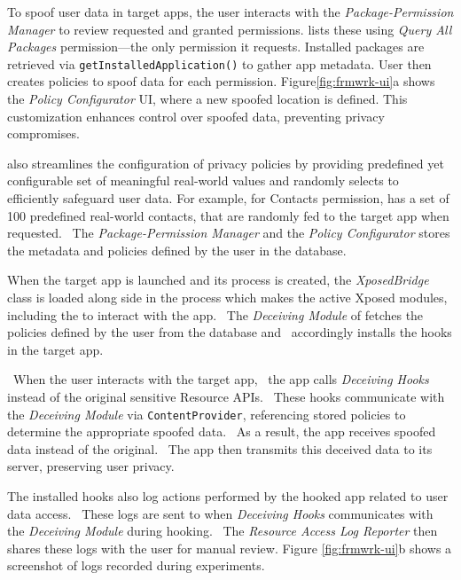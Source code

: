 To spoof user data in target apps, the user interacts with the \textit{Package-Permission Manager} to review requested and granted permissions. \framework{} lists these using \textit{Query All Packages} permission—the only permission it requests. Installed packages are retrieved via \texttt{getInstalledApplication()} to gather app metadata. User then creates policies to spoof data for each permission. Figure\ref{fig:frmwrk-ui}a shows the \textit{Policy Configurator} UI, where a new spoofed location is defined. This customization enhances control over spoofed data, preventing privacy compromises.

\framework{} also streamlines the configuration of privacy policies by providing predefined yet configurable set of meaningful real-world values and randomly selects to efficiently safeguard user data. For example, for Contacts permission, \framework{} has a set of 100 predefined real-world contacts, that are randomly fed to the target app when requested. ~The \textit{Package-Permission Manager} and the \textit{Policy Configurator} stores the metadata and policies defined by the user in the database. 

When the target app is launched and its process is created, the \textit{XposedBridge} class is loaded along side in the process which makes the active Xposed modules, including the \framework{} to interact with the app. ~The \textit{Deceiving Module} of \framework{} fetches the policies defined by the user from the database and ~accordingly installs the hooks in the target app.

~When the user interacts with the target app, ~the app calls \textit{Deceiving Hooks} instead of the original sensitive Resource APIs. ~These hooks communicate with the \textit{Deceiving Module} via \texttt{ContentProvider}, referencing stored policies to determine the appropriate spoofed data. ~As a result, the app receives spoofed data instead of the original. ~The app then transmits this deceived data to its server, preserving user privacy.

The installed hooks also log actions performed by the hooked app related to user data access. ~These logs are sent to \framework{} when \textit{Deceiving Hooks} communicates with the \textit{Deceiving Module} during hooking. ~The \textit{Resource Access Log Reporter} then shares these logs with the user for manual review. Figure \ref{fig:frmwrk-ui}b shows a screenshot of logs recorded during experiments.